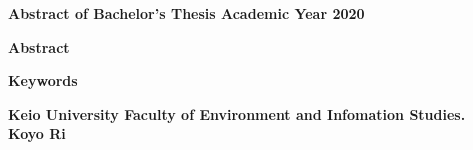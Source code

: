 \begin{center}
\textbf{\large Abstract of Bachelor's Thesis Academic Year 2020}

\vspace{6mm}

\textbf{\large }

\end{center}

\vspace{10mm}


\begin{flushleft}
\textbf{Abstract}\\
\end{flushleft}

\begin{flushleft}
\textbf{Keywords}\\
\textbf{}
\end{flushleft}

\begin{flushright}
\textbf{Keio University Faculty of Environment and Infomation Studies.}\\
\textbf{Koyo Ri}\\
\end{flushright}
